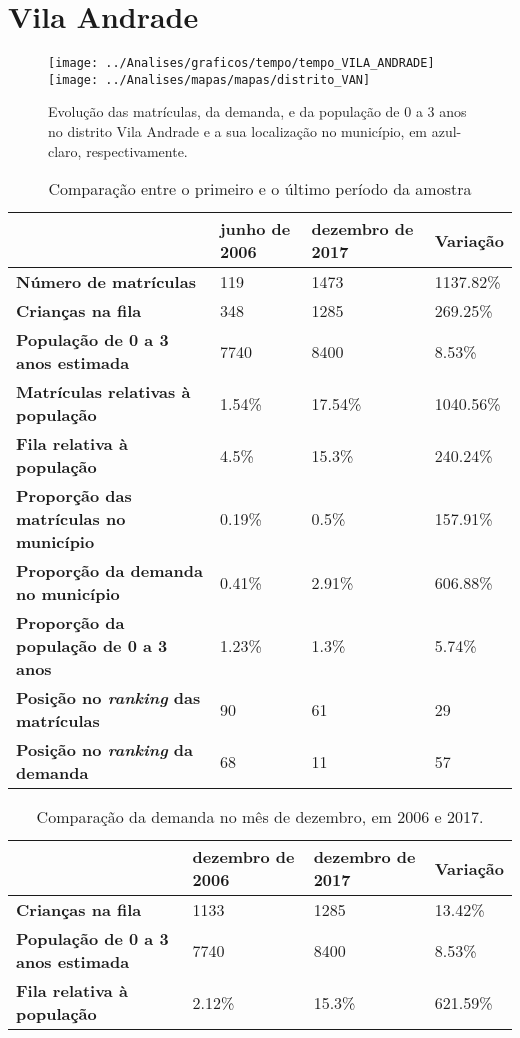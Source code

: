 \section{Vila Andrade}
\begin{figure}[H]
\centering
\texttt{[image: ../Analises/graficos/tempo/tempo\_VILA\_ANDRADE]}
\texttt{[image: ../Analises/mapas/mapas/distrito\_VAN]}
\caption{Evolução das matrículas, da demanda, e da população de 0 a 3 anos no distrito Vila Andrade e a sua localização no município, em azul-claro, respectivamente.}
\end{figure}
\begin{table}[H]
\begin{tabular}{l|l|l|l}
\textbf{}                                      & \textbf{junho de 2006}       & \textbf{dezembro de 2017}    & \textbf{Variação} \\ \hline
\textbf{Número de matrículas}                  & 119 & 1473 & 1137.82\% \\ \hline
\textbf{Crianças na fila}                      & 348 & 1285 & 269.25\% \\ \hline
\textbf{População de 0 a 3 anos estimada}      & 7740 & 8400 & 8.53\% \\ \hline
\textbf{Matrículas relativas à população}      & 1.54\% & 17.54\% & 1040.56\% \\ \hline
\textbf{Fila relativa à população}             & 4.5\% & 15.3\% & 240.24\% \\ \hline
\textbf{Proporção das matrículas no município} & 0.19\% & 0.5\% & 157.91\% \\ \hline
\textbf{Proporção da demanda no município}     & 0.41\% & 2.91\% & 606.88\% \\ \hline
\textbf{Proporção da população de 0 a 3 anos}  & 1.23\% & 1.3\% & 5.74\% \\ \hline
\textbf{Posição no \textit{ranking} das matrículas}     & 90 & 61 & 29 \\ \hline
\textbf{Posição no \textit{ranking} da demanda}         & 68 & 11 & 57 \\ 
\end{tabular}
\caption{Comparação entre o primeiro e o último período da amostra}
\end{table}
\begin{table}[H]
\begin{tabular}{l|l|l|l}
\textbf{}                                 & \textbf{dezembro de 2006} & \textbf{dezembro de 2017} & \textbf{Variação} \\ \hline
\textbf{Crianças na fila}                      & 1133 & 1285 & 13.42\% \\ \hline
\textbf{População de 0 a 3 anos estimada}      & 7740 & 8400 & 8.53\% \\ \hline
\textbf{Fila relativa à população}             & 2.12\% & 15.3\% & 621.59\% \\
\end{tabular}
\caption{Comparação da demanda no mês de dezembro, em 2006 e 2017.}
\end{table}
